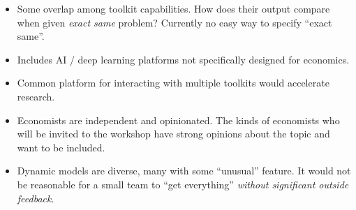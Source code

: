 \documentclass[12pt,pdftex,letterpaper]{article}
\begin{document}
\begin{itemize}
	\item Some overlap among toolkit capabilities. How does their output compare when given \textit{exact same} problem? Currently no easy way to specify ``exact same''.
	
	\item Includes AI / deep learning platforms not specifically designed for economics.
	
	\item Common platform for interacting with multiple toolkits would accelerate research.
	
	\item Economists are independent and opinionated. The kinds of economists who will be invited to the workshop have strong opinions about the topic and want to be included.
	
	\item Dynamic models are diverse, many with some ``unusual'' feature. It would not be reasonable for a small team to ``get everything'' \textit{without significant outside feedback}.
\end{itemize}
\end{document}
